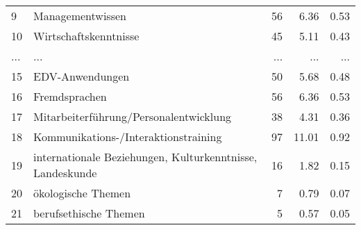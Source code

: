 \begin{longtable}{lXrrr}
        9 & \multicolumn{1}{X}{Managementwissen} & %
          \num{56} &
          \num[round-mode=places,round-precision=2]{6,36} &
          \num[round-mode=places,round-precision=2]{0,53} \\
        10 & \multicolumn{1}{X}{Wirtschaftskenntnisse} & %
          \num{45} &
          \num[round-mode=places,round-precision=2]{5,11} &
          \num[round-mode=places,round-precision=2]{0,43} \\
       ... & ... & ... & ... & ... \\
        15 & \multicolumn{1}{X}{EDV-Anwendungen} & %
          \num{50} &
          \num[round-mode=places,round-precision=2]{5,68} &
          \num[round-mode=places,round-precision=2]{0,48} \\

        16 & \multicolumn{1}{X}{Fremdsprachen} & %
          \num{56} &
          \num[round-mode=places,round-precision=2]{6,36} &
          \num[round-mode=places,round-precision=2]{0,53} \\

        17 & \multicolumn{1}{X}{Mitarbeiterführung/Personalentwicklung} & %
          \num{38} &
          \num[round-mode=places,round-precision=2]{4,31} &
          \num[round-mode=places,round-precision=2]{0,36} \\

        18 & \multicolumn{1}{X}{Kommunikations-/Interaktionstraining} & %
          \num{97} &
          \num[round-mode=places,round-precision=2]{11,01} &
          \num[round-mode=places,round-precision=2]{0,92} \\

        19 & \multicolumn{1}{X}{internationale Beziehungen, Kulturkenntnisse, Landeskunde} & %
          \num{16} &
          \num[round-mode=places,round-precision=2]{1,82} &
          \num[round-mode=places,round-precision=2]{0,15} \\

        20 & \multicolumn{1}{X}{ökologische Themen} & %
          \num{7} &
          \num[round-mode=places,round-precision=2]{0,79} &
          \num[round-mode=places,round-precision=2]{0,07} \\

        21 & \multicolumn{1}{X}{berufsethische Themen} & %
          \num{5} &
          \num[round-mode=places,round-precision=2]{0,57} &
          \num[round-mode=places,round-precision=2]{0,05} \\


\end{longtable}
